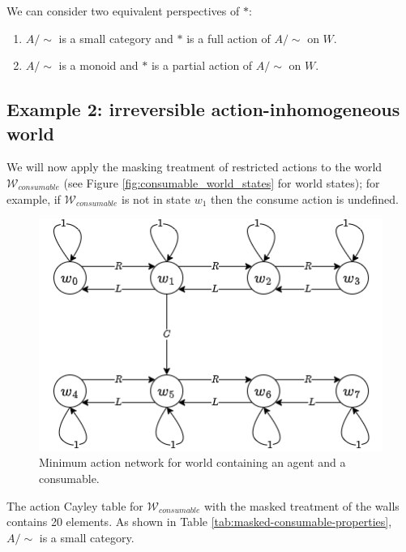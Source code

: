 \begin{remark}
    We can consider two equivalent perspectives of $*$:
    \begin{enumerate}
        \item $A/\sim$ is a small category and $*$ is a full action of $A/\sim$ on $W$.
        \item $A/\sim$ is a monoid and $*$ is a partial action of $A/\sim$ on $W$.
    \end{enumerate}
\end{remark}

\subsection{Example 2: irreversible action-inhomogeneous world}\label{sec:masked irreversible action-inhomogeneous world}

We will now apply the masking treatment of restricted actions to the world $\mathscr{W}_{consumable}$ (see Figure \ref{fig:consumable_world_states} for world states); for example, if $\mathscr{W}_{consumable}$ is not in state $w_{1}$ then the consume action is undefined.

\begin{figure}[H]
    \centering
    \includegraphics[scale=0.5]{5BeyondSBDRL/Old/Images/fig-min-action-net-world-with-consumable-masked.png}
    \caption{Minimum action network for world containing an agent and a consumable.}
    \label{fig-min-action-net-world-with-consumable-masked}
\end{figure}

The action Cayley table for $\mathscr{W}_{consumable}$ with the masked treatment of the walls contains 20 elements.
As shown in Table \ref{tab:masked-consumable-properties}, $A/\sim$ is a small category.


